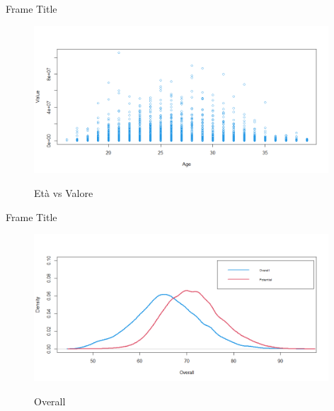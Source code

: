 \documentclass[aspectratio=169,xcolor=dvipsnames]{beamer}
\begin{document}
\begin{frame}{Frame Title}
\begin{figure}[H] 
\begin{center} 
  \includegraphics[width=11cm]{Rplot5.png}\\ 
  \caption{Età vs Valore} 
\end{center} 
\end{figure}
\end{frame}


\begin{frame}{Frame Title}
\begin{figure}[H] 
\begin{center} 
  \includegraphics[width=11cm]{Rplot3.png}\\ 
  \caption{Overall} 
\end{center} 
\end{figure}
\end{frame}

\end{document}
